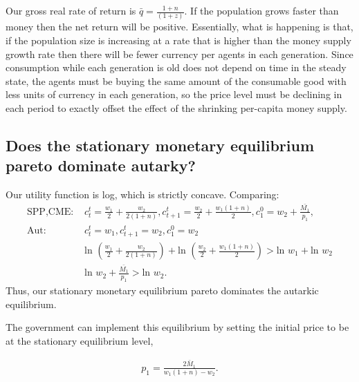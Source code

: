 \documentclass[11pt]{article} %
\begin{document}
Our gross real rate of return is $\bar{q} = \frac{1+n}{(1+z)}$. If the population grows faster than money then the net return will be positive. Essentially, what is happening is that, if the population size is increasing at a rate that is higher than the money supply growth rate then there will be fewer currency per agents in each generation. Since consumption while each generation is old does not depend on time in the steady state, the agents must be buying the same amount of the consumable good with less units of currency in each generation, so the price level must be declining in each period to exactly offset the effect of the shrinking per-capita money supply.

\subsection{Does the stationary monetary equilibrium pareto dominate autarky?}

Our utility function is log, which is strictly concave. Comparing:
\begin{align*}
\text{SPP,CME: }& c_t^t = \frac{w_1}{2} + \frac{w_2}{2(1+n)},  c_{t+1}^t = \frac{w_2}{2} + \frac{w_1(1+n)}{2}, c_1^0 = w_2 + \frac{\bar{M_1}}{p_1},\\
\text{Aut: }& c_t^t = w_1, c_{t+1}^t = w_2, c_1^0 = w_2 \\
&\text{ln }  (\frac{w_1}{2} + \frac{w_2}{2(1+n)}) + \text{ln } (\frac{w_2}{2} + \frac{w_1(1+n)}{2}) > \text{ln } w_1+ \text{ln } w_2\\
&\text{ln }  w_2 + \frac{\bar{M_1}}{p_1} > \text{ln } w_2.
\end{align*}
Thus, our stationary monetary equilibrium pareto dominates the autarkic equilibrium.

The government can implement this equilibrium by setting the initial price to be at the stationary equilibrium level,

\begin{align*}
p_1 =  \frac{2\bar{M}_1}{w_1(1+n) - w_2}.
\end{align*}
\end{document}
